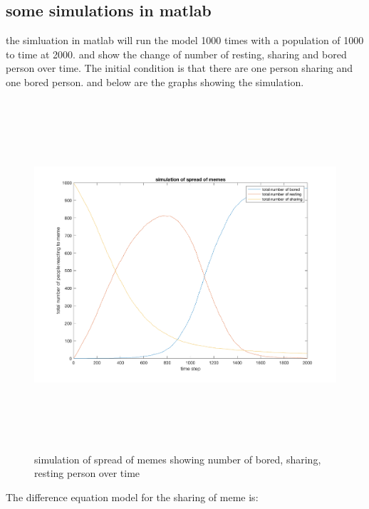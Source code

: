 \documentclass[12pt]{article}
\begin{document}
\subsection{some simulations in matlab}
the simluation in matlab will run the model 1000 times with a population of 1000 to time at 2000. and show the change of number of resting, sharing and bored person over time. The initial condition is that there are one person sharing and one bored person. and below are the graphs showing the simulation. 

\begin{figure}[H] %
\centering
\includegraphics[width = 16 cm, height = 13cm]{memes_1.png}
\caption{simulation of spread of memes showing number of bored, sharing, resting person over time}
\label{fig:meme_sim}
\end{figure}

The difference equation model for the sharing of meme is: 
\end{document}
